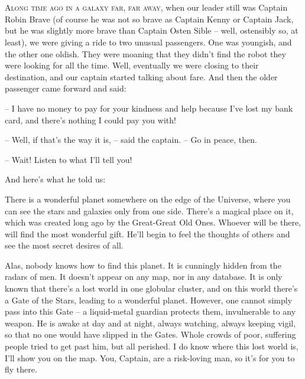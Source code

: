 \documentclass[ebook,oneside,final,openright]{memoir}
\begin{document}
\chapter{}
\par
\lettrine{A}{long time ago in a galaxy far, far away,} when our leader still was Captain Robin Brave (of course he was not so brave as Captain Kenny or Captain Jack, but he was slightly more brave than Captain Osten Sible – well, ostensibly so, at least), we were giving a ride to two unusual passengers. One was youngish, and the other one oldish. They were moaning that they didn’t find the robot they were looking for all the time. Well, eventually we were closing to their destination, and our captain started talking about fare. And then the older passenger came forward and said: \par
\par
– I have no money to pay for your kindness and help because I’ve lost my bank card, and there’s nothing I could pay you with!\par
– Well, if that’s the way it is, – said the captain. – Go in peace, then. \par
– Wait! Listen to what I’ll tell you! \par
 And here’s what he told us:\par
\par
 There is a wonderful planet somewhere on the edge of the Universe, where you can see the stars and galaxies only from one side. There’s a magical place on it, which was created long ago by the Great-Great Old Ones. Whoever will be there, will find the most wonderful gift. He’ll begin to feel the thoughts of others and see the most secret desires of all. \par
Alas, nobody knows how to find this planet. It is cunningly hidden from the radars of men. It doesn’t appear on any map, nor in any database. It is only known that there’s a lost world in one globular cluster, and on this world there’s a Gate of the Stars, leading to a wonderful planet. However, one cannot simply pass into this Gate – a liquid-metal guardian protects them, invulnerable to any weapon. He is awake at day and at night, always watching, always keeping vigil, so that no one would have slipped in the Gates. Whole crowds of poor, suffering people tried to get past him, but all perished. I do know where this lost world is, I’ll show you on the map. You, Captain, are a risk-loving man, so it’s for you to fly there.\par
\par
\end{document}
